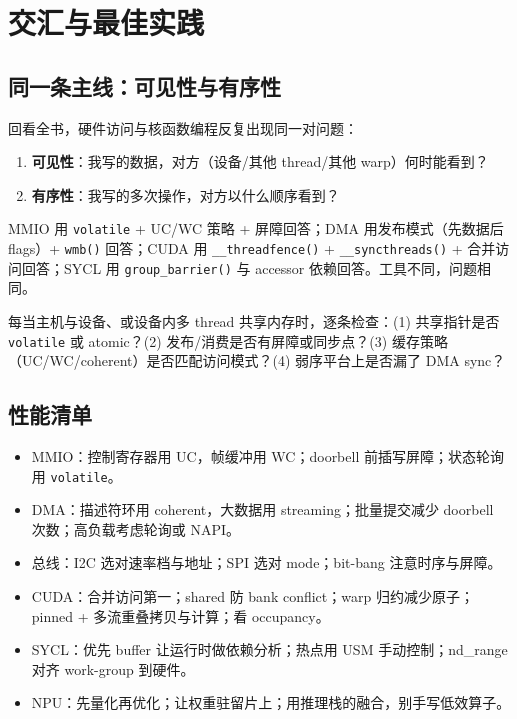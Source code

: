\documentclass[12pt,a4paper,fontset=fandol]{ctexbook}
\newcommand{\Fn}[1]{\texttt{#1()}}
\newcommand{\kw}[1]{\texttt{#1}}
\begin{document}
\chapter{交汇与最佳实践}\label{ch:converge}

\section{同一条主线：可见性与有序性}\label{sec:converge-core}

回看全书，硬件访问与核函数编程反复出现同一对问题：

\begin{enumerate}[nosep]
  \item \textbf{可见性}：我写的数据，对方（设备/其他 thread/其他 warp）何时能看到？
  \item \textbf{有序性}：我写的多次操作，对方以什么顺序看到？
\end{enumerate}

MMIO 用 \kw{volatile} + UC/WC 策略 + 屏障回答；DMA 用发布模式（先数据后 flags）+ \Fn{wmb} 回答；CUDA 用 \Fn{\_\_threadfence} + \Fn{\_\_syncthreads} + 合并访问回答；SYCL 用 \Fn{group\_barrier} 与 accessor 依赖回答。工具不同，问题相同。

\begin{tcolorbox}[guideline={一张清单检查所有共享}]
每当主机与设备、或设备内多 thread 共享内存时，逐条检查：(1) 共享指针是否 \kw{volatile} 或 atomic？(2) 发布/消费是否有屏障或同步点？(3) 缓存策略（UC/WC/coherent）是否匹配访问模式？(4) 弱序平台上是否漏了 DMA sync？
\end{tcolorbox}

\section{性能清单}\label{sec:perf-checklist}

\begin{itemize}[nosep]
  \item MMIO：控制寄存器用 UC，帧缓冲用 WC；doorbell 前插写屏障；状态轮询用 \kw{volatile}。
  \item DMA：描述符环用 coherent，大数据用 streaming；批量提交减少 doorbell 次数；高负载考虑轮询或 NAPI。
  \item 总线：I2C 选对速率档与地址；SPI 选对 mode；bit-bang 注意时序与屏障。
  \item CUDA：合并访问第一；shared 防 bank conflict；warp 归约减少原子；pinned + 多流重叠拷贝与计算；看 occupancy。
  \item SYCL：优先 buffer 让运行时做依赖分析；热点用 USM 手动控制；nd\_range 对齐 work-group 到硬件。
  \item NPU：先量化再优化；让权重驻留片上；用推理栈的融合，别手写低效算子。
\end{itemize}
\end{document}
